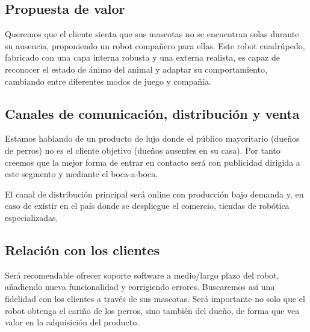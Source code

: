 \subsection{Propuesta de valor}


Queremos que el cliente sienta que sus mascotas no se encuentran solas durante su ausencia, proponiendo un robot compañero para ellas. Este robot cuadrúpedo, fabricado con una capa interna robusta y una externa realista, es capaz de reconocer el estado de ánimo del animal y adaptar su comportamiento, cambiando entre diferentes modos de juego y compañía.

\subsection{Canales de comunicación, distribución y venta}


Estamos hablando de un producto de lujo donde el público mayoritario (dueños de perros) no es el cliente objetivo (dueños ausentes en su casa). Por tanto creemos que la mejor forma de entrar en contacto será con publicidad dirigida a este segmento y mediante el boca-a-boca.

El canal de distribución principal será online con producción bajo demanda y, en caso de existir en el país donde se despliegue el comercio, tiendas de robótica especializadas.

\subsection{Relación con los clientes}


Será recomendable ofrecer soporte software a medio/largo plazo del robot, añadiendo nueva funcionalidad y corrigiendo errores. Buscaremos así una fidelidad con los clientes a través de sus mascotas.
Será importante no solo que el robot obtenga el cariño de los perros, sino también del dueño, de forma que vea valor en la adquisición del producto.


